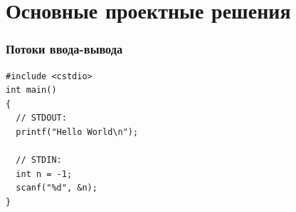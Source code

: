 \documentclass{beamer}
\begin{document}
\section{Основные проектные решения}

\begin{frame}[fragile]
  \frametitle{Потоки ввода-вывода}

\begin{lstlisting}
#include <cstdio>
int main()
{
  // STDOUT:
  printf("Hello World\n");

  // STDIN:
  int n = -1;
  scanf("%d", &n);
}
\end{lstlisting}
\end{frame}



\end{document}
